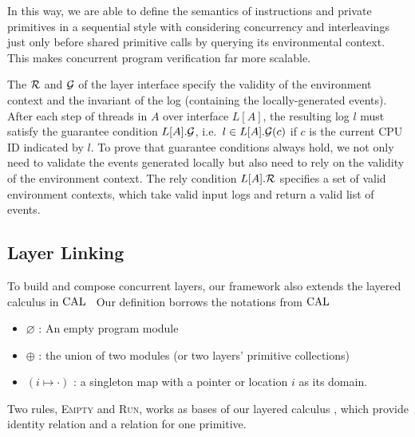 In this way, we are able to define the semantics of instructions
and private primitives in a sequential style 
with considering concurrency
and interleavings  just only before 
shared primitive calls by querying its environmental context.
This makes concurrent program verification far more scalable.

The $\mathcal{R}$ and $\mathcal{G}$ of the layer interface specify the validity of the environment context and the invariant of the log (containing the locally-generated events).
After each step of threads in $A$ over interface $L[A]$, 
the resulting log $l$  must satisfy the guarantee condition $L[A].\mathcal{G}$, i.e.\, $l \in L[A].\mathcal{G}(c)$ if $c$ is the current CPU ID indicated by $l$. 
To prove that
 guarantee conditions always hold,  we not only need to validate the events generated locally
but also need to rely on the validity of the environment context. The rely condition $L[A].\mathcal{R}$ specifies a set of
valid environment contexts, which take valid input logs
and return a valid list of events.










\subsection{Layer Linking}
\label{chapter:ccal:subsec:linking}

To build and compose concurrent layers, 
our framework also extends the layered calculus in $\mathrm{CAL}$~\cite{deepspec}
Our definition borrows the notations
from $\mathrm{CAL}$
\begin{itemize}
\item $\varnothing$ : An  empty program module
\item $\oplus$ : the union of two modules (or two layers' primitive collections)
\item $(i\mapsto \cdot)$ : a singleton map with a pointer or location $i$ as its domain.
\end{itemize}

Two rules, \textsc{Empty} and \textsc{Run}, works as bases of our layered calculus , which 
provide identity relation and a relation for one primitive. 

